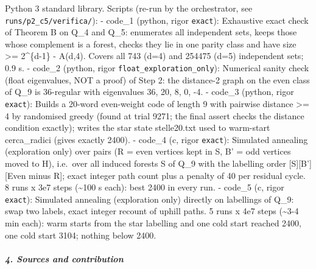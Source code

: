 \documentclass[11pt,a4paper]{article}
\begin{document}
Python 3 standard library. Scripts (re-run by the orchestrator, see
\texttt{runs/p2\_c5/verifica/}): - code\_1 (python, rigor
\texttt{exact}): Exhaustive exact check of Theorem B on Q\_4 and Q\_5:
enumerates all independent sets, keeps those whose complement is a
forest, checks they lie in one parity class and have size \textgreater=
2\^{}\{d-1\} - A(d,4). Covers all 743 (d=4) and 254475 (d=5) independent
sets; 0.9 s. - code\_2 (python, rigor
\texttt{float\_exploration\_only}): Numerical sanity check (float
eigenvalues, NOT a proof) of Step 2: the distance-2 graph on the even
class of Q\_9 is 36-regular with eigenvalues 36, 20, 8, 0, -4. - code\_3
(python, rigor \texttt{exact}): Builds a 20-word even-weight code of
length 9 with pairwise distance \textgreater= 4 by randomised greedy
(found at trial 9271; the final assert checks the distance condition
exactly); writes the star state stelle20.txt used to warm-start
cerca\_radici (gives exactly 2400). - code\_4 (c, rigor \texttt{exact}):
Simulated annealing (exploration only) over pairs (R = even vertices
kept in S, B' = odd vertices moved to H), i.e.~over all induced forests
S of Q\_9 with the labelling order {[}S{]}{[}B'{]}{[}Even minus R{]};
exact integer path count plus a penalty of 40 per residual cycle. 8 runs
x 3e7 steps (\textasciitilde100 s each): best 2400 in every run. -
code\_5 (c, rigor \texttt{exact}): Simulated annealing (exploration
only) directly on labellings of Q\_9: swap two labels, exact integer
recount of uphill paths. 5 runs x 4e7 steps (\textasciitilde3-4 min
each): warm starts from the star labelling and one cold start reached
2400, one cold start 3104; nothing below 2400.

\subparagraph{4. Sources and
contribution}\label{sources-and-contribution}
\end{document}
